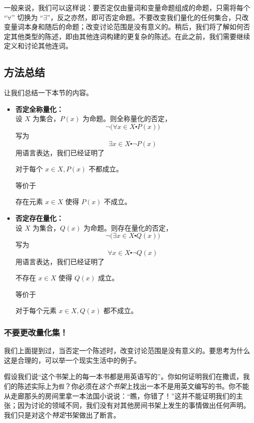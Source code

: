 一般来说，我们可以这样说：要否定仅由量词和变量命题组成的命题，只需将每个 ``$\forall$'' 切换为 ``$\exists$''，反之亦然，即可否定命题。不要改变我们量化的任何集合，只改变量词本身和随后的命题；改变讨论范围是没有意义的。稍后，我们将了解如何否定其他类型的陈述，即由其他连词构建的更复杂的陈述。在此之前，我们需要继续定义和讨论其他连词。

\subsection{方法总结}

让我们总结一下本节的内容。
\begin{itemize}
    \item \textbf{否定全称量化：} \\
        设 $X$ 为集合，$P(x)$ 为命题。则全称量化的否定，
        \[\neg \big(\forall x \in X \centerdot P(x)\big)\]
        写为
        \[\exists x \in X \centerdot \neg P(x)\]
        用语言表达，我们已经证明了
        \begin{center}
            对于每个 $x \in X, P(x)$ 不都成立。
        \end{center}
        等价于
        \begin{center}
            存在元素 $x \in X$ 使得 $P(x)$ 不成立。
        \end{center}
    \item \textbf{否定存在量化：} \\
        设 $X$ 为集合，$Q(x)$ 为命题。则存在量化的否定，
        \[\neg \big(\exists x \in X \centerdot Q(x)\big)\]
        写为
        \[\forall x \in X \centerdot \neg Q(x)\]
        用语言表达，我们已经证明了
        \begin{center}
            不存在 $x \in X$ 使得 $Q(x)$ 成立。
        \end{center}
        等价于
        \begin{center}
            对于每个元素 $x \in X, Q(x)$ 都不成立。
        \end{center}
\end{itemize}

\subsubsection*{不要更改量化集！}

我们上面提到过，当否定一个陈述时，改变讨论范围是没有意义的。要思考为什么这是合理的，可以举一个现实生活中的例子。

假设我们说``这个书架上的每一本书都是用英语写的''。你如何证明我们在撒谎，我们的陈述实际上为\verb|假|？你必须在\emph{这个书架}上找出一本不是用英文编写的书。你不能从走廊那头的房间里拿一本法国小说说：``瞧，你错了！''这并不能证明我们的主张；因为讨论的领域不同，我们没有对其他房间书架上发生的事情做出任何声明。我们只是对这个\emph{特定}书架做出了断言。

